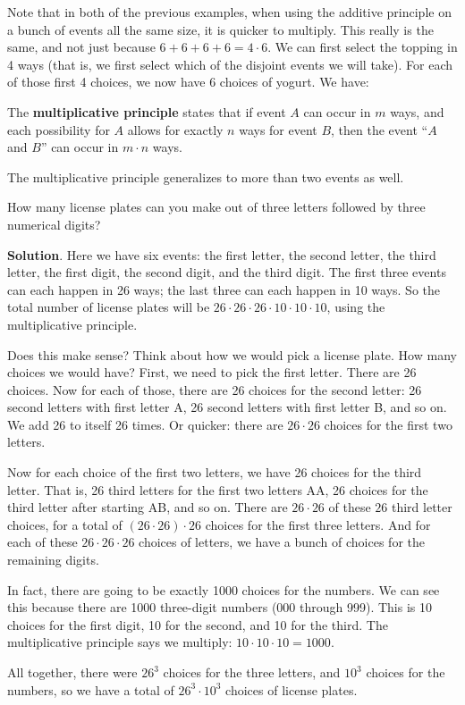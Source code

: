 \documentclass[11pt,]{book}
\newcommand{\terminology}[1]{\textbf{#1}}
\theoremstyle{ptxplainnotitle}
\theoremstyle{ptxplaintitle}
\theoremstyle{ptxdefinitionnotitle}
\theoremstyle{ptxdefinitiontitle}
\theoremstyle{ptxdefinitionnotitle}
\theoremstyle{ptxdefinitiontitle}
\theoremstyle{ptxdefinitionnotitle}
\theoremstyle{ptxdefinitiontitle}
\theoremstyle{ptxdefinitiontitlenonumber}
\theoremstyle{ptxdefinitiontitlenonumber}
\numberwithin{equation}{chapter}
\begin{document}
\hypertarget{p-1042}{}%
Note that in both of the previous examples, when using the additive principle on a bunch of events all the same size, it is quicker to multiply. This really is the same, and not just because \(6 + 6 + 6 + 6 = 4\cdot 6\). We can first select the topping in 4 ways (that is, we first select which of the disjoint events we will take). For each of those first 4 choices, we now have 6 choices of yogurt. We have:%
\begin{assemblage}\label{assemblage-12}
\hypertarget{p-1043}{}%
The \terminology{multiplicative principle} states that if event \(A\) can occur in \(m\) ways, and each possibility for \(A\) allows for exactly \(n\) ways for event \(B\), then the event ``\(A\) and \(B\)'' can occur in \(m \cdot n\) ways.%
\end{assemblage}
\hypertarget{p-1044}{}%
The multiplicative principle generalizes to more than two events as well.%
\begin{example}\label{example-37}
\hypertarget{p-1045}{}%
How many license plates can you make out of three letters followed by three numerical digits?%
\par\smallskip%
\noindent\textbf{Solution}.\hypertarget{solution-146}{}\quad%
\hypertarget{p-1046}{}%
Here we have six events: the first letter, the second letter, the third letter, the first digit, the second digit, and the third digit. The first three events can each happen in 26 ways; the last three can each happen in 10 ways. So the total number of license plates will be \(26\cdot 26\cdot 26 \cdot 10 \cdot 10 \cdot 10\), using the multiplicative principle.%
\par
\hypertarget{p-1047}{}%
Does this make sense? Think about how we would pick a license plate. How many choices we would have? First, we need to pick the first letter. There are 26 choices. Now for each of those, there are 26 choices for the second letter: 26 second letters with first letter A, 26 second letters with first letter B, and so on. We add 26 to itself 26 times. Or quicker: there are \(26 \cdot 26\) choices for the first two letters.%
\par
\hypertarget{p-1048}{}%
Now for each choice of the first two letters, we have 26 choices for the third letter. That is, 26 third letters for the first two letters AA, 26 choices for the third letter after starting AB, and so on. There are \(26 \cdot 26\) of these \(26\) third letter choices, for a total of \((26\cdot26)\cdot 26\) choices for the first three letters. And for each of these \(26\cdot26\cdot26\) choices of letters, we have a bunch of choices for the remaining digits.%
\par
\hypertarget{p-1049}{}%
In fact, there are going to be exactly 1000 choices for the numbers. We can see this because there are 1000 three-digit numbers (000 through 999). This is 10 choices for the first digit, 10 for the second, and 10 for the third. The multiplicative principle says we multiply: \(10\cdot 10 \cdot 10 = 1000\).%
\par
\hypertarget{p-1050}{}%
All together, there were \(26^3\) choices for the three letters, and \(10^3\) choices for the numbers, so we have a total of \(26^3 \cdot 10^3\) choices of license plates.%
\end{example}
\end{document}
